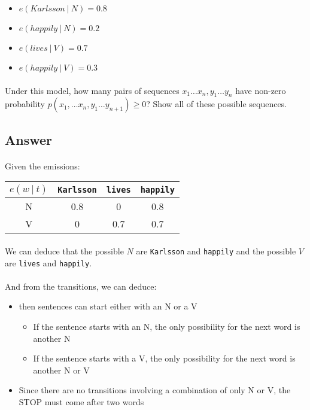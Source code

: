 \documentclass{article}
\newcommand\given[1][]{\:#1\vert\:}
\begin{document}
\begin{itemize}
    \item $e(Karlsson \given N) = 0.8$
    \item $e(happily \given N) = 0.2$
    \item $e(lives \given V) = 0.7$
    \item $e(happily \given V) = 0.3$
\end{itemize}

\paragraph{} Under this model, how many pairs of sequences $x_1 \dots x_n , y_1 \dots y_n$ have non-zero probability $p(x_1, \dots x_n , y_1 \dots y_{n+1}) \ge 0$? Show all of these possible sequences.

\subsection*{Answer}

\paragraph{} Given the emissions:

\begin{tabular}{c|c|c|c}
    $e(w \given t)$ & \texttt{Karlsson} & \texttt{lives} & \texttt{happily}\\
     \hline
    N & 0.8 & 0 & 0.8 \\
    V & 0 & 0.7 & 0.7
\end{tabular}

\paragraph{} We can deduce that the possible $N$ are \texttt{Karlsson} and \texttt{happily} and the possible $V$ are \texttt{lives} and \texttt{happily}.

\paragraph{} And from the transitions, we can deduce:

\begin{itemize}
    \item then sentences can start either with an N or a V
    \begin{itemize}
        \item If the sentence starts with an N, the only possibility for the next word is another N
        \item If the sentence starts with a V, the only possibility for the next word is another N or V
    \end{itemize}
    \item Since there are no transitions involving a combination of only N or V, the STOP must come after two words
\end{itemize}
\end{document}
